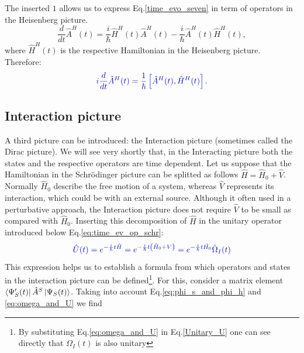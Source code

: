 \documentclass[12pt, titlepage]{article}
\begin{document}
The inserted $ 1 $ allows us to express Eq.\enskip\eqref{time_evo_seven} in term of operators in the Heisenberg picture.
\begin{equation}
\frac{d}{dt}\hat{A}^{H}(t)
	=\frac{i}{\hbar}
	\hat{H}^{H}(t)\hat{A}^{H}(t)
	-
	\frac{i}{\hbar}
	\hat{A}^{H}(t)\hat{H}^{H}(t),
\end{equation} 
where $ \hat{H}^{H}(t) $ is the respective Hamiltonian in the Heisenberg  picture.
Therefore:
\begin{equation}\label{eq:Heisenberg_time_dep._eq.}
\textcolor[RGB]{0,0,204}{
i\frac{d}{d t}\hat{A}^{H}(t)=
\frac{1}{\hbar}\left[ \hat{A}^{H}(t),\hat{H}^{H}(t)\right] 
.
}
\end{equation} 
\subsection{Interaction picture}\label{Interactionpicture}
A third picture can be introduced: the Interaction picture (sometimes called the Dirac picture). We will see very shortly that, in the Interacting picture both the states and the respective operators are time dependent.
Let us suppose that the Hamiltonian in the Schrödinger picture can be splitted as follows $ \hat{H} = \hat{H}_{0}+\hat{V} $. Normally $ \hat{H}_{0} $ describe the free motion of a system, whereas  $ \hat{V} $ represents its interaction, which could be with an external source. Although it often used in a perturbative approach, the Interaction picture does not require $ \hat{V} $  to be small as compared with $ \hat{H}_{0} $. 
Inserting this decomposition of $ \hat{H} $ in the unitary operator introduced below Eq.\enskip\eqref{eq:time_ev_op_schr}:
\begin{equation}\label{eq:omega_and_U}
\textcolor[RGB]{0,0,204}{
\hat{U}(t)=e^{-\frac{i}{\hbar}t \hat{H}}
=e^{-\frac{i}{\hbar}t\left(  \hat{H}_{0}+V\right) }
=
e^{-\frac{i}{\hbar}t \hat{H_{0}}}
\hat{\Omega}_{I} (t)
}
\end{equation}
This expression helps us to establish a formula from which operators and states in the interaction picture can be defined\footnote{By substituting Eq.\enskip\eqref{eq:omega_and_U} in Eq.\enskip\eqref{Unitary_U} one can see directly that $ \Omega_{I}(t) $ is also unitary}. For this, consider a matrix element $ 	\bra{\Psi_{S}^{\prime}(t)}
	\hat{A}^{S}
	\ket{\Psi_{S}(t)} $. Taking into account Eq.\enskip\eqref{eq:phi_s_and_phi_h} and \eqref{eq:omega_and_U} we find
\end{document}
